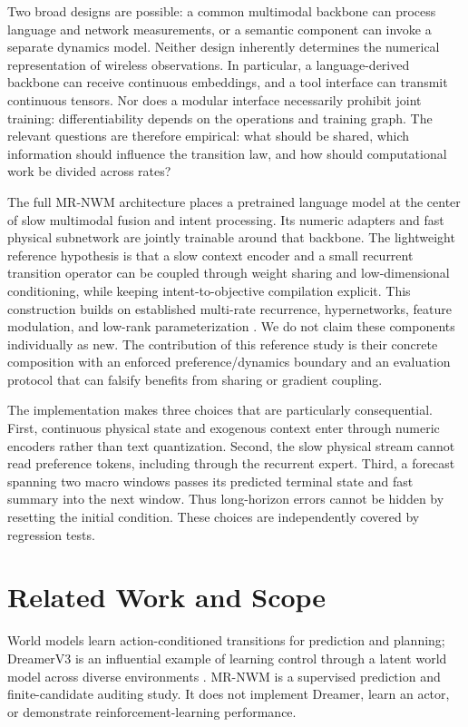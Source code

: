 \documentclass[10pt,twocolumn]{article}
\begin{document}
Two broad designs are possible: a common multimodal backbone can process
language and network measurements, or a semantic component can invoke a
separate dynamics model. Neither design inherently determines the numerical
representation of wireless observations. In particular, a language-derived
backbone can receive continuous embeddings, and a tool interface can transmit
continuous tensors. Nor does a modular interface necessarily prohibit joint
training: differentiability depends on the operations and training graph.
The relevant questions are therefore empirical: what should be shared, which
information should influence the transition law, and how should computational
work be divided across rates?

The full MR-NWM architecture places a pretrained language model at the center
of slow multimodal fusion and intent processing. Its numeric adapters and fast
physical subnetwork are jointly trainable around that backbone. The lightweight
reference hypothesis is that a slow context encoder and a small recurrent
transition operator can be coupled through weight sharing and low-dimensional
conditioning, while keeping intent-to-objective compilation explicit.
This construction builds on established multi-rate recurrence, hypernetworks,
feature modulation, and low-rank parameterization
\cite{koutnik2014,ha2016,perez2018,hu2022}. We do not claim these components
individually as new. The contribution of this reference study is their concrete
composition with an enforced preference/dynamics boundary and an evaluation
protocol that can falsify benefits from sharing or gradient coupling.

The implementation makes three choices that are particularly consequential.
First, continuous physical state and exogenous context enter through numeric
encoders rather than text quantization. Second, the slow physical stream cannot
read preference tokens, including through the recurrent expert. Third, a
forecast spanning two macro windows passes its predicted terminal state and
fast summary into the next window. Thus long-horizon errors cannot be hidden by
resetting the initial condition. These choices are independently covered by
regression tests.



\section{Related Work and Scope}
World models learn action-conditioned transitions for prediction and planning;
DreamerV3 is an influential example of learning control through a latent world
model across diverse environments \cite{hafner2023}. MR-NWM is a supervised
prediction and finite-candidate auditing study. It does not implement Dreamer,
learn an actor, or demonstrate reinforcement-learning performance.
\end{document}

